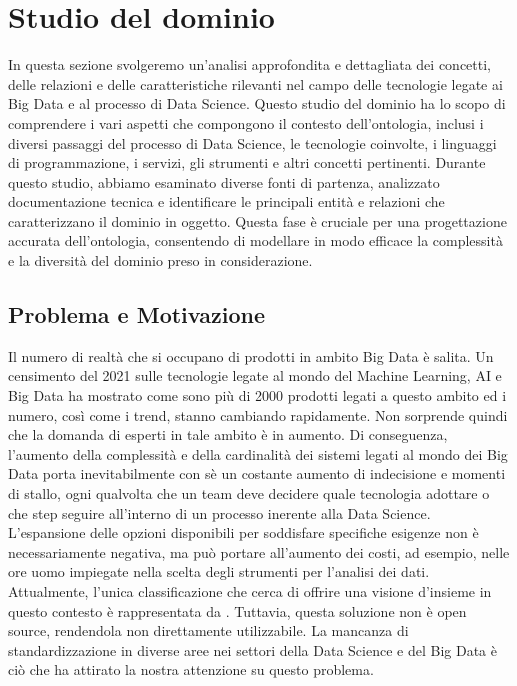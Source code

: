 \chapter{Studio del dominio}
In questa sezione svolgeremo un'analisi approfondita e dettagliata dei concetti, delle relazioni e delle caratteristiche rilevanti nel campo delle tecnologie legate ai Big Data e al processo di Data Science. Questo studio del dominio ha lo scopo di comprendere i vari aspetti che compongono il contesto dell'ontologia, inclusi i diversi passaggi del processo di Data Science, le tecnologie coinvolte, i linguaggi di programmazione, i servizi, gli strumenti e altri concetti pertinenti. Durante questo studio, abbiamo esaminato diverse fonti di partenza, analizzato documentazione tecnica e identificare le principali entità e relazioni che caratterizzano il dominio in oggetto. Questa fase è cruciale per una progettazione accurata dell'ontologia, consentendo di modellare in modo efficace la complessità e la diversità del dominio preso in considerazione.

\section{Problema e Motivazione}\label{sec:motivazione}
Il numero di realtà che si occupano di prodotti in ambito Big Data è salita. Un censimento del 2021 \cite{bigdatalandscape2021} sulle tecnologie legate al mondo del Machine Learning, AI e Big Data ha mostrato come sono più di 2000 prodotti legati a questo ambito ed i numero, così come i trend, stanno cambiando rapidamente. Non sorprende quindi che la domanda di esperti in tale ambito è in aumento. Di conseguenza, l'aumento della complessità e della cardinalità dei sistemi legati al mondo dei Big Data porta inevitabilmente con sè un costante aumento di indecisione e momenti di stallo, ogni qualvolta che un team deve decidere quale tecnologia adottare o che step seguire all'interno di un processo inerente alla Data Science.\\ 

L'espansione delle opzioni disponibili per soddisfare specifiche esigenze non è necessariamente negativa, ma può portare all'aumento dei costi, ad esempio, nelle ore uomo impiegate nella scelta degli strumenti per l'analisi dei dati. Attualmente, l'unica classificazione che cerca di offrire una visione d'insieme in questo contesto è rappresentata da \cite{BDOnto}. Tuttavia, questa soluzione non è open source, rendendola non direttamente utilizzabile. La mancanza di standardizzazione in diverse aree nei settori della Data Science e del Big Data è ciò che ha attirato la nostra attenzione su questo problema.

